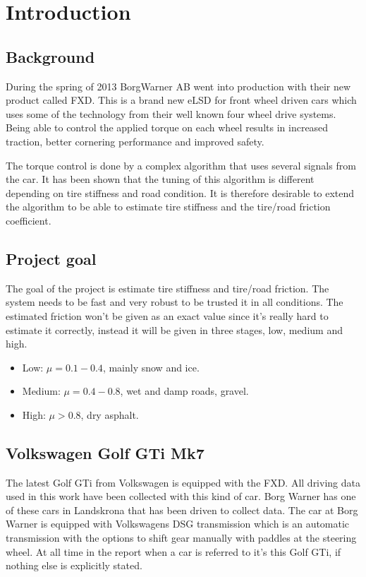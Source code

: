 \chapter{Introduction}

\section{Background}
During the spring of 2013 BorgWarner AB went into production with their new product called FXD. This is a brand new eLSD for front wheel driven cars which uses some of the technology from their well known four wheel drive systems. Being able to control the applied torque on each wheel results in increased traction, better cornering performance and improved safety.

The torque control is done by a complex algorithm that uses several signals from the car. It has been shown that the tuning of this algorithm is different depending on tire stiffness and road condition. It is therefore desirable to extend the algorithm to be able to estimate tire stiffness and the tire/road friction coefficient.

\section{Project goal}
The goal of the project is estimate tire stiffness and tire/road friction. The system needs to be fast and very robust to be trusted it in all conditions. The estimated friction won't be given as an exact value since it's really hard to estimate it correctly, instead it will be given in three stages, low, medium and high.

\begin{itemize}
	\item Low: $ \mu = 0.1-0.4 $, mainly snow and ice.
	\item Medium: $ \mu = 0.4-0.8 $, wet and damp roads, gravel.
	\item High: $ \mu > 0.8 $, dry asphalt.
\end{itemize}

\section{Volkswagen Golf GTi Mk7}
The latest Golf GTi from Volkswagen is equipped with the FXD. All driving data used in this work have been collected with this kind of car. Borg Warner has one of these cars in Landskrona that has been driven to collect data. The car at Borg Warner is equipped with Volkswagens DSG transmission which is an automatic transmission with the options to shift gear manually with paddles at the steering wheel. At all time in the report when a car is referred to it's this Golf GTi, if nothing else is explicitly stated.

